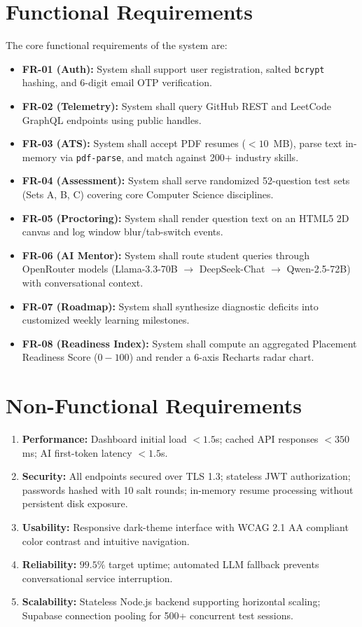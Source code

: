 \section{Functional Requirements}
The core functional requirements of the system are:
\begin{itemize}
    \item \textbf{FR-01 (Auth):} System shall support user registration, salted \texttt{bcrypt} hashing, and 6-digit email OTP verification.
    \item \textbf{FR-02 (Telemetry):} System shall query GitHub REST and LeetCode GraphQL endpoints using public handles.
    \item \textbf{FR-03 (ATS):} System shall accept PDF resumes ($<10$~MB), parse text in-memory via \texttt{pdf-parse}, and match against 200+ industry skills.
    \item \textbf{FR-04 (Assessment):} System shall serve randomized 52-question test sets (Sets A, B, C) covering core Computer Science disciplines.
    \item \textbf{FR-05 (Proctoring):} System shall render question text on an HTML5 2D canvas and log window blur/tab-switch events.
    \item \textbf{FR-06 (AI Mentor):} System shall route student queries through OpenRouter models (Llama-3.3-70B $\rightarrow$ DeepSeek-Chat $\rightarrow$ Qwen-2.5-72B) with conversational context.
    \item \textbf{FR-07 (Roadmap):} System shall synthesize diagnostic deficits into customized weekly learning milestones.
    \item \textbf{FR-08 (Readiness Index):} System shall compute an aggregated Placement Readiness Score ($0-100$) and render a 6-axis Recharts radar chart.
\end{itemize}

\section{Non-Functional Requirements}
\begin{enumerate}
    \item \textbf{Performance:} Dashboard initial load $<1.5$s; cached API responses $<350$ms; AI first-token latency $<1.5$s.
    \item \textbf{Security:} All endpoints secured over TLS 1.3; stateless JWT authorization; passwords hashed with 10 salt rounds; in-memory resume processing without persistent disk exposure.
    \item \textbf{Usability:} Responsive dark-theme interface with WCAG 2.1 AA compliant color contrast and intuitive navigation.
    \item \textbf{Reliability:} $99.5\%$ target uptime; automated LLM fallback prevents conversational service interruption.
    \item \textbf{Scalability:} Stateless Node.js backend supporting horizontal scaling; Supabase connection pooling for 500+ concurrent test sessions.
\end{enumerate}

